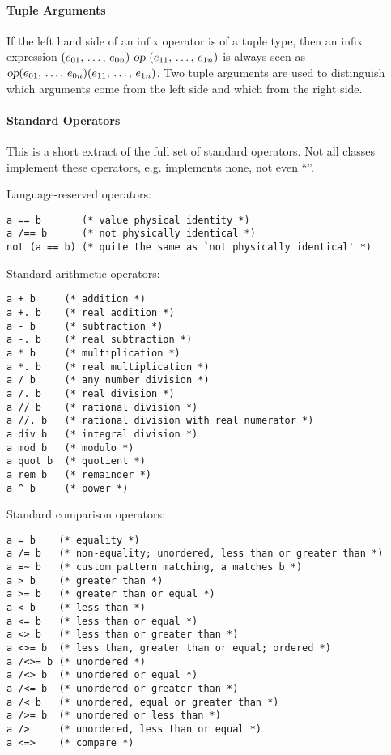 \paragraph{Tuple Arguments}

If the left hand side of an infix operator is of a tuple type, then an infix expression $(e_{01} ,\, \ldots ,\, e_{0n})\ \mbox{\sl op}\ (e_{11} ,\, \ldots ,\, e_{1n})$ is always seen as $\mbox{\sl op}(e_{01} ,\, \ldots ,\, e_{0n})(e_{11} ,\, \ldots ,\, e_{1n})$. Two tuple arguments are used to distinguish which arguments come from the left side and which from the right side. 





\paragraph{Standard Operators}

This is a short extract of the full set of standard operators. Not all classes implement these operators, e.g.  implements none, not even ``\code{=}''. 

Language-reserved operators:
\begin{lstlisting}
a == b       (* value physical identity *)
a /== b      (* not physically identical *)
not (a == b) (* quite the same as `not physically identical' *)
\end{lstlisting}

Standard arithmetic operators:
\begin{lstlisting}
a + b     (* addition *)
a +. b    (* real addition *)
a - b     (* subtraction *)
a -. b    (* real subtraction *)
a * b     (* multiplication *)
a *. b    (* real multiplication *)
a / b     (* any number division *)
a /. b    (* real division *)
a // b    (* rational division *)
a //. b   (* rational division with real numerator *)
a div b   (* integral division *)
a mod b   (* modulo *)
a quot b  (* quotient *)
a rem b   (* remainder *)
a ^ b     (* power *)
\end{lstlisting}

Standard comparison operators:
\begin{lstlisting}
a = b    (* equality *)
a /= b   (* non-equality; unordered, less than or greater than *)
a =~ b   (* custom pattern matching, a matches b *)
a > b    (* greater than *)
a >= b   (* greater than or equal *)
a < b    (* less than *)
a <= b   (* less than or equal *)
a <> b   (* less than or greater than *)
a <>= b  (* less than, greater than or equal; ordered *)
a /<>= b (* unordered *)
a /<> b  (* unordered or equal *)
a /<= b  (* unordered or greater than *)
a /< b   (* unordered, equal or greater than *)
a />= b  (* unordered or less than *)
a />     (* unordered, less than or equal *)
a <=>    (* compare *)
\end{lstlisting}

